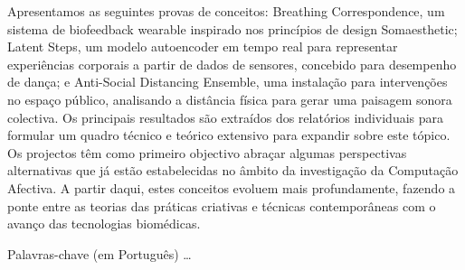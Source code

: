 Apresentamos as seguintes provas de conceitos: Breathing Correspondence, um sistema de biofeedback wearable inspirado nos princípios de design Somaesthetic; Latent Steps, um modelo autoencoder em tempo real para representar experiências corporais a partir de dados de sensores, concebido para desempenho de dança; e Anti-Social Distancing Ensemble, uma instalação para intervenções no espaço público, analisando a distância física para gerar uma paisagem sonora colectiva. Os principais resultados são extraídos dos relatórios individuais para formular um quadro técnico e teórico extensivo para expandir sobre este tópico. Os projectos têm como primeiro objectivo abraçar algumas perspectivas alternativas que já estão estabelecidas no âmbito da investigação da Computação Afectiva. A partir daqui, estes conceitos evoluem mais profundamente, fazendo a ponte entre as teorias das práticas criativas e técnicas contemporâneas com o avanço das tecnologias biomédicas.


\begin{keywords}
Palavras-chave (em Português) \ldots
\end{keywords}
